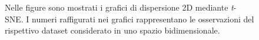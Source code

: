 \documentclass[12pt,italian]{report}
\begin{document}

\begin{figure}
	\centering
	\caption{Nelle figure sono mostrati i grafici di dispersione 2D mediante \emph{t}-SNE. I numeri raffigurati nei grafici rappresentano le osservazioni del rispettivo dataset considerato in uno spazio bidimensionale.}
	\label{fig:tsne_2d}
\end{figure}
\end{document}
